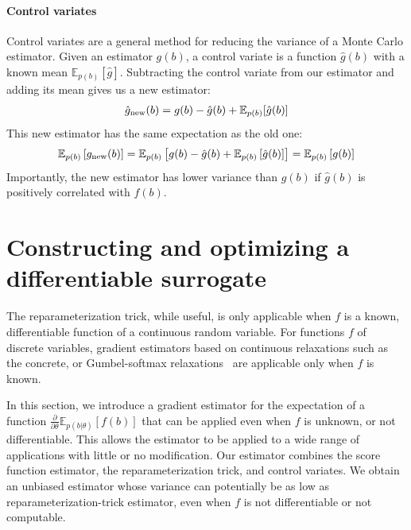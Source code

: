 \documentclass{article}
\newcommand{\controlf}{\hat g}  %
\newcommand{\E}{\mathbb{E}}
\newcommand{\PT}{\frac{\partial}{\partial \theta}}
\begin{document}
\paragraph{Control variates}
Control variates are a general method for reducing the variance of a Monte Carlo estimator.
Given an estimator $g(b)$, a control variate is a function $\controlf(b)$ with a known mean $\mathbb{E}_{p(b)} [ \controlf ]$.
Subtracting the control variate from our estimator and adding its mean gives us a new estimator:
%
\begin{align}
\hat g_\textnormal{new}(b) = g(b) - \controlf(b) + \mathbb{E}_{p(b)}[\controlf(b)]
\end{align}
%
This new estimator has the same expectation as the old one:
%
\begin{align}
\mathbb{E}_{p(b)}\left[ g_\textnormal{new}(b) \right] 
= \mathbb{E}_{p(b)}\left[g(b) - \controlf(b) + \mathbb{E}_{p(b)} \left[ \controlf(b) \right] \right]
= \mathbb{E}_{p(b)}\left[ g(b) \right]
\end{align}
%
Importantly, the new estimator has lower variance than $g(b)$ if $\controlf(b)$ is positively correlated with $f(b)$.



\section{Constructing and optimizing a differentiable surrogate}
\label{lax section}
The reparameterization trick, while useful, is only applicable when $f$ is a known, differentiable function of a continuous random variable.
For functions $f$ of discrete variables, gradient estimators based on continuous relaxations such as the concrete, or Gumbel-softmax relaxations~\cite{maddison2016concrete, jang2016categorical} are applicable only when $f$ is known.

In this section, we introduce a gradient estimator for the expectation of a function $\PT \E_{p(b|\theta)}[f(b)]$ that can be applied even when $f$ is unknown, or not differentiable.
This allows the estimator to be applied to a wide range of applications with little or no modification.
Our estimator combines the score function estimator, the reparameterization trick, and control variates.
We obtain an unbiased estimator whose variance can potentially be as low as reparameterization-trick estimator, even when $f$ is not differentiable or not computable.
\end{document}
